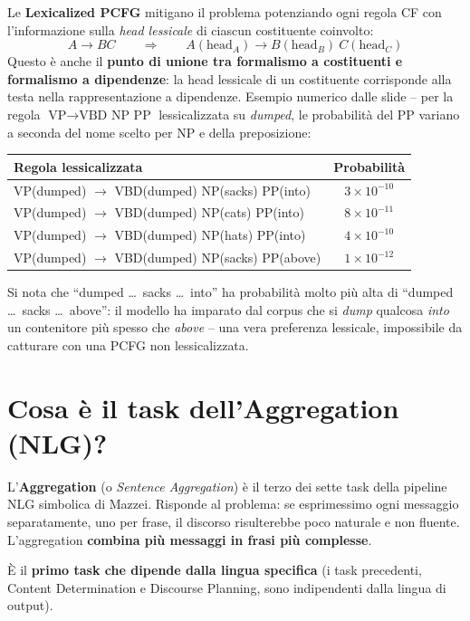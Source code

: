 \documentclass[12pt,a4paper]{article}
\begin{document}
Le \textbf{Lexicalized PCFG} mitigano il problema potenziando ogni regola CF con l'informazione sulla \emph{head lessicale} di ciascun costituente coinvolto:
\[
A \to BC \qquad\Longrightarrow\qquad A(\text{head}_A) \to B(\text{head}_B)\ C(\text{head}_C)
\]
Questo è anche il \textbf{punto di unione tra formalismo a costituenti e formalismo a dipendenze}: la head lessicale di un costituente corrisponde alla testa nella rappresentazione a dipendenze. Esempio numerico dalle slide -- per la regola $\text{VP} \to \text{VBD\ NP\ PP}$ lessicalizzata su \textit{dumped}, le probabilità del PP variano a seconda del nome scelto per NP e della preposizione:
\begin{center}
\small
\begin{tabular}{lc}
\toprule
Regola lessicalizzata & Probabilità \\
\midrule
VP(dumped) $\to$ VBD(dumped) NP(sacks) PP(into) & $3\times 10^{-10}$ \\
VP(dumped) $\to$ VBD(dumped) NP(cats) PP(into) & $8\times 10^{-11}$ \\
VP(dumped) $\to$ VBD(dumped) NP(hats) PP(into) & $4\times 10^{-10}$ \\
VP(dumped) $\to$ VBD(dumped) NP(sacks) PP(above) & $1\times 10^{-12}$ \\
\bottomrule
\end{tabular}
\end{center}
Si nota che ``dumped \dots\ sacks \dots\ into'' ha probabilità molto più alta di ``dumped \dots\ sacks \dots\ above'': il modello ha imparato dal corpus che si \emph{dump} qualcosa \emph{into} un contenitore più spesso che \emph{above} -- una vera preferenza lessicale, impossibile da catturare con una PCFG non lessicalizzata.

\section{Cosa è il task dell'Aggregation (NLG)?}

L'\textbf{Aggregation} (o \emph{Sentence Aggregation}) è il terzo dei sette task della pipeline NLG simbolica di Mazzei. Risponde al problema: se esprimessimo ogni messaggio separatamente, uno per frase, il discorso risulterebbe poco naturale e non fluente. L'aggregation \textbf{combina più messaggi in frasi più complesse}.

\begin{defbox}
È il \textbf{primo task che dipende dalla lingua specifica} (i task precedenti, Content Determination e Discourse Planning, sono indipendenti dalla lingua di output).
\end{defbox}
\end{document}
